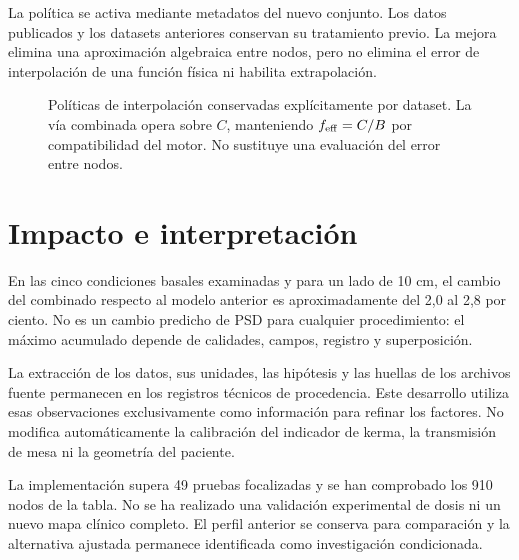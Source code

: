 La política se activa mediante metadatos del nuevo conjunto. Los datos publicados y los datasets anteriores conservan su tratamiento previo. La mejora elimina una aproximación algebraica entre nodos, pero no elimina el error de interpolación de una función física ni habilita extrapolación.

\begin{figure}[htbp]\centering
\caption{Políticas de interpolación conservadas explícitamente por dataset. La vía combinada opera sobre $C$, manteniendo $f_{\rm eff}=C/B$ por compatibilidad del motor. No sustituye una evaluación del error entre nodos.}\label{fig:consulta_C}\end{figure}

\section{Impacto e interpretación}
En las cinco condiciones basales examinadas y para un lado de 10 cm, el cambio del combinado respecto al modelo anterior es aproximadamente del 2,0 al 2,8 por ciento. No es un cambio predicho de PSD para cualquier procedimiento: el máximo acumulado depende de calidades, campos, registro y superposición.

La extracción de los datos, sus unidades, las hipótesis y las huellas de los archivos fuente permanecen en los registros técnicos de procedencia. Este desarrollo utiliza esas observaciones exclusivamente como información para refinar los factores. No modifica automáticamente la calibración del indicador de kerma, la transmisión de mesa ni la geometría del paciente.

La implementación supera 49 pruebas focalizadas y se han comprobado los 910 nodos de la tabla. No se ha realizado una validación experimental de dosis ni un nuevo mapa clínico completo. El perfil anterior se conserva para comparación y la alternativa ajustada permanece identificada como investigación condicionada.


\FloatBarrier
